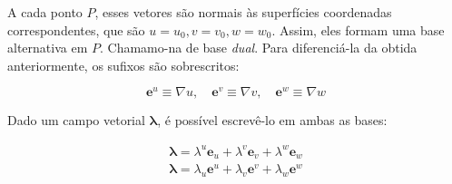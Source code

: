A cada ponto $ P $, esses vetores são normais às superfícies coordenadas correspondentes, que são $ u=u_0, v=v_0, w=w_0 $. Assim, eles formam uma base alternativa em $ P $. Chamamo-na de base \textit{dual}. Para diferenciá-la da obtida anteriormente, os sufixos são sobrescritos:

\begin{equation}\label{eq:VetoresDuaisU}
\boxed{\mathbf{e}^{u} \equiv \nabla u, \quad \mathbf{e}^{v} \equiv \nabla v, \quad \mathbf{e}^{w} \equiv \nabla w}
\end{equation} 

Dado um campo vetorial $ \mathbf{\lambda} $, é possível escrevê-lo em ambas as bases:

\begin{equation}\label{eq:LambdaEmAmbasAsBases}
\begin{array}{l}{\boldsymbol{\lambda}=\lambda^{u} \mathbf{e}_{u}+\lambda^{v} \mathbf{e}_{v}+\lambda^{w} \mathbf{e}_{w}} \\ {\boldsymbol{\lambda}=\lambda_{u} \mathbf{e}^{u}+\lambda_{v} \mathbf{e}^{v}+\lambda_{w} \mathbf{e}^{w}}\end{array}
\end{equation}

